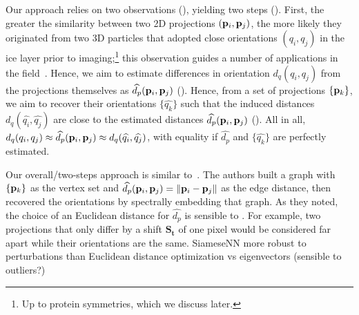 Our approach relies on two observations (), yielding two steps ().
First, the greater the similarity between two 2D projections $(\mathbf{p}_i, \mathbf{p}_j)$, the more likely they originated from two 3D particles that adopted close orientations $(q_i, q_j)$ in the ice layer prior to imaging;\footnote{Up to protein symmetries, which we discuss later.} this observation guides a number of applications in the field~\cite{frank2006three}.
Hence, we aim to estimate differences in orientation $d_q(q_i, q_j)$ from the projections themselves as $\widehat{d_p}(\mathbf{p}_i, \mathbf{p}_j)$ ().
Hence, from a set of projections $\{\mathbf{p}_k\}$, we aim to recover their orientations $\{\widehat{q_k}\}$ such that the induced distances $d_q(\widehat{q_i}, \widehat{q_j})$ are close to the estimated distances $\widehat{d_p}(\mathbf{p}_i, \mathbf{p}_j)$ ().
All in all, $d_q(q_i, q_j) \approx \widehat{d_p}(\mathbf{p}_i, \mathbf{p}_j) \approx d_q(\widehat{q_i}, \widehat{q_j})$, with equality if $\widehat{d_p}$ and $\{\widehat{q_k}\}$ are perfectly estimated.

Our overall/two-steps approach is similar to~\cite{coifman2008graphprojections}.
The authors built a graph with $\{\mathbf{p}_k\}$ as the vertex set and $\widehat{d_p}(\mathbf{p}_i, \mathbf{p}_j) = \| \mathbf{p}_i - \mathbf{p}_j \|$ as the edge distance, then recovered the orientations by spectrally embedding that graph.
As they noted, the choice of an Euclidean distance for $\widehat{d_p}$ is sensible to .
For example, two projections that only differ by a shift $\mathbf{S_t}$ of one pixel would be considered far apart while their orientations are the same.
SiameseNN more robust to perturbations than Euclidean distance
optimization vs eigenvectors (sensible to outliers?)


